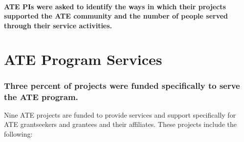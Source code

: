 \documentclass[
]{report}
\begin{document}
\hypertarget{ate-pis-were-asked-to-identify-the-ways-in-which-their-projects-supported-the-ate-community-and-the-number-of-people-served-through-their-service-activities.}{%
\paragraph{ATE PIs were asked to identify the ways in which their projects supported the ATE community and the number of people served through their service activities.}\label{ate-pis-were-asked-to-identify-the-ways-in-which-their-projects-supported-the-ate-community-and-the-number-of-people-served-through-their-service-activities.}}

\hypertarget{ate-program-services-1}{%
\section{ATE Program Services}\label{ate-program-services-1}}

\hypertarget{three-percent-of-projects-were-funded-specifically-to-serve-the-ate-program.}{%
\subsubsection{Three percent of projects were funded specifically to serve the ATE program.}\label{three-percent-of-projects-were-funded-specifically-to-serve-the-ate-program.}}

Nine ATE projects are funded to provide services and support specifically for ATE grantseekers and grantees and their affiliates. These projects include the following:
\end{document}
